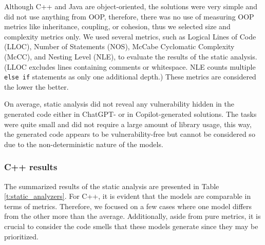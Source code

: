 Although C++ and Java are object-oriented, the solutions were very simple and did not use anything from OOP, therefore, there was no use of measuring OOP metrics like inheritance, coupling, or cohesion, thus we selected size and complexity metrics only.
We used several metrics, such as Logical Lines of Code (LLOC), Number of Statements (NOS), McCabe Cyclomatic Complexity (McCC), and Nesting Level (NLE), to evaluate the results of the static analysis.
(LLOC excludes lines containing comments or whitespace. NLE counts multiple \texttt{else if} statements as only one additional depth.)
These metrics are considered the lower the better.

On average, static analysis did not reveal any vulnerability hidden in the generated code either in ChatGPT- or in Copilot-generated solutions.
The tasks were quite small and did not require a large amount of library usage, this way, the generated code appears to be vulnerability-free but cannot be considered so due to the non-deterministic nature of the models.

\subsubsection{C++ results}

The summarized results of the static analysis are presented in Table \ref{t:static_analyzers}.
For C++, it is evident that the models are comparable in terms of metrics.
Therefore, we focused on a few cases where one model differs from the other more than the average.
Additionally, aside from pure metrics, it is crucial to consider the code smells that these models generate since they may be prioritized.

